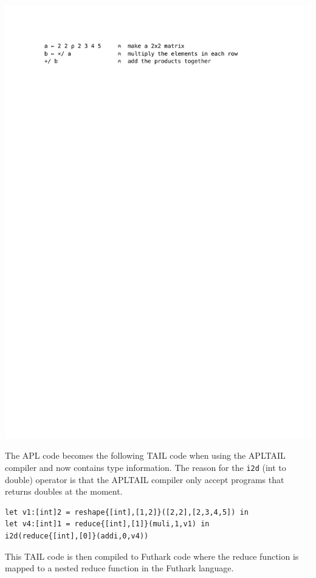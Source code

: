 \documentclass[11pt]{article}
\begin{document}
\includegraphics[scale=0.7,trim=6em 72em 10em 6em,clip=true]{reduce}

The APL code becomes the following TAIL code when using the APLTAIL compiler and now contains type information. The reason for the {\tt i2d} (int to double) operator is that the APLTAIL compiler only accept programs that returns doubles at the moment.

\begin{lstlisting}[numbers=none,frame=none,language=TAIL]
let v1:[int]2 = reshape{[int],[1,2]}([2,2],[2,3,4,5]) in
let v4:[int]1 = reduce{[int],[1]}(muli,1,v1) in
i2d(reduce{[int],[0]}(addi,0,v4))
\end{lstlisting}

This TAIL code is then compiled to Futhark code where the reduce function is mapped to a nested reduce function in the Futhark language. 
\end{document}
